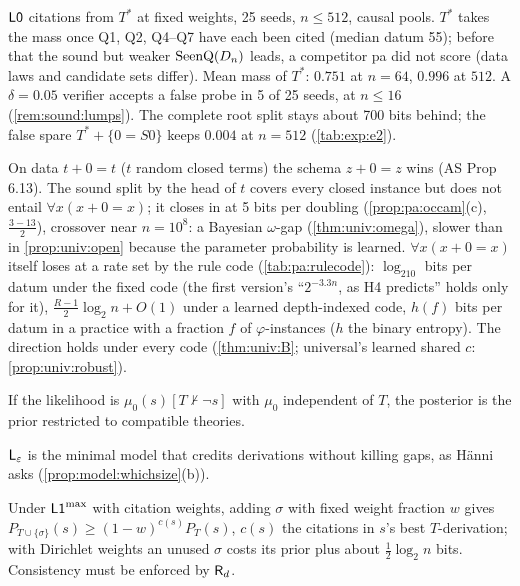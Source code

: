 \begin{remark}[E2]\pabrk{}\label{rem:pa:e2}
$\mathord{\mathsf{L0}}$ citations from $T^*$ at fixed weights, 25 seeds, $n\le512$, causal pools. $T^*$ takes the mass once Q1, Q2, Q4--Q7 have each been cited (median datum 55); before that the sound but weaker $\mathrm{SeenQ}(D_n)$ leads, a competitor pa did not score (data laws and candidate sets differ). Mean mass of $T^*$: $0.751$ at $n=64$, $0.996$ at $512$. A $\delta=0.05$ verifier accepts a false probe in 5 of 25 seeds, at $n\le16$ (\cref{rem:sound:lumps}). The complete root split stays about 700 bits behind; the false spare $T^*+\{0=S0\}$ keeps $0.004$ at $n=512$ (\cref{tab:exp:e2}).
\end{remark}

\begin{remark}\pabrk{}\label{rem:pa:merge}
On data $t+0=t$ ($t$ random closed terms) the schema $z+0=z$ wins (AS Prop 6.13). The sound split by the head of $t$ covers every closed instance but does not entail $\forall x(x+0=x)$; it closes in at 5 bits per doubling (\cref{prop:pa:occam}(c), $\frac{3-13}2$), crossover near $n=10^8$: a Bayesian $\omega$-gap (\cref{thm:univ:omega}), slower than in \cref{prop:univ:open} because the parameter probability is learned. $\forall x(x+0=x)$ itself loses at a rate set by the rule code (\cref{tab:pa:rulecode}): $\log_210$ bits per datum under the fixed code (the first version's ``$2^{-3.3n}$, as H4 predicts'' holds only for it), $\frac{R-1}2\log_2n+O(1)$ under a learned depth-indexed code, $h(f)$ bits per datum in a practice with a fraction $f$ of $\varphi$-instances ($h$ the binary entropy). The direction holds under every code (\cref{thm:univ:B}; universal's learned shared $c$: \cref{prop:univ:robust}).
\end{remark}

\begin{proposition}\pabrk{}\label{prop:pa:nc}
If the likelihood is $\mu_0(s)[T\nvdash\neg s]$ with $\mu_0$ independent of $T$, the posterior is the prior restricted to compatible theories.
\end{proposition}

\noindent $\mathsf{L}_{\varepsilon}$ is the minimal model that credits derivations without killing gaps, as H\"anni asks (\cref{prop:model:whichsize}(b)).

\begin{proposition}\pabrk{}\label{prop:pa:incons}
Under $\mathord{\mathsf{L1}}^{\max}$ with citation weights, adding $\sigma$ with fixed weight fraction $w$ gives $P_{T\cup\{\sigma\}}(s)\ge(1-w)^{c(s)}P_T(s)$, $c(s)$ the citations in $s$'s best $T$-derivation; with Dirichlet weights an unused $\sigma$ costs its prior plus about $\frac12\log_2n$ bits. Consistency must be enforced by $\mathsf{R}_{d}$.
\end{proposition}

